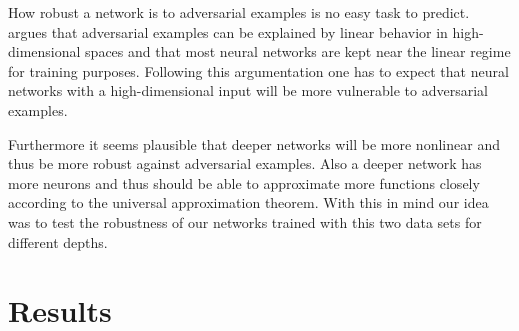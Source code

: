 \documentclass[%
 reprint,
 amsmath,amssymb,
 aps,
]{revtex4-1}
\begin{document}
How robust a network is to adversarial examples is no easy task to predict. \citeauthor{paperGrad} argues that adversarial examples can be explained by linear behavior in high-dimensional spaces and that most neural networks are kept near the linear regime for training purposes. Following this argumentation one has to expect that neural networks with a high-dimensional input will be more vulnerable to adversarial examples.

Furthermore it seems plausible that deeper networks will be more nonlinear and thus be more robust against adversarial examples. Also a deeper network has more neurons and thus should be able to approximate more functions closely according to the universal approximation theorem. With this in mind our idea was to test the robustness of our networks trained with this two data sets for different depths.



\section{Results}
\end{document}
